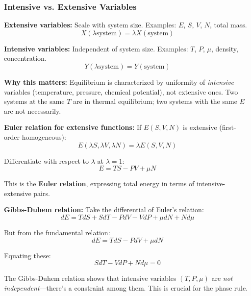 \documentclass[9pt,twocoloumn]{article}
\begin{document}
\subsubsection{Intensive vs. Extensive Variables}

\textbf{Extensive variables:} Scale with system size. Examples: $E$, $S$, $V$, $N$, total mass.
\begin{equation}
X(\lambda \text{system}) = \lambda X(\text{system})
\end{equation}

\textbf{Intensive variables:} Independent of system size. Examples: $T$, $P$, $\mu$, density, concentration.
\begin{equation}
Y(\lambda \text{system}) = Y(\text{system})
\end{equation}

\textbf{Why this matters:} Equilibrium is characterized by uniformity of \emph{intensive} variables (temperature, pressure, chemical potential), not extensive ones. Two systems at the same $T$ are in thermal equilibrium; two systems with the same $E$ are not necessarily.

\textbf{Euler relation for extensive functions:} If $E(S, V, N)$ is extensive (first-order homogeneous):
\begin{equation}
E(\lambda S, \lambda V, \lambda N) = \lambda E(S, V, N)
\end{equation}

Differentiate with respect to $\lambda$ at $\lambda = 1$:
\begin{equation}
\boxed{E = TS - PV + \mu N}
\end{equation}

This is the \textbf{Euler relation}, expressing total energy in terms of intensive-extensive pairs.

\textbf{Gibbs-Duhem relation:} Take the differential of Euler's relation:
\begin{equation}
dE = T dS + S dT - P dV - V dP + \mu dN + N d\mu
\end{equation}

But from the fundamental relation:
\begin{equation}
dE = T dS - P dV + \mu dN
\end{equation}

Equating these:
\begin{equation}
\boxed{S dT - V dP + N d\mu = 0}
\end{equation}

The Gibbs-Duhem relation shows that intensive variables $(T, P, \mu)$ are \emph{not independent}—there's a constraint among them. This is crucial for the phase rule.
\end{document}
